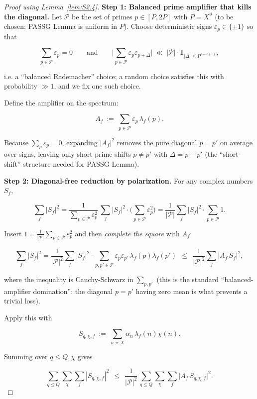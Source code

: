 \documentclass[11pt]{article}
\theoremstyle{definition}
\theoremstyle{remark}
\numberwithin{equation}{part}
\begin{document}
\begin{proof}[Proof using Lemma~\ref{lem:S2.4}]

	\noindent\textbf{Step 1: Balanced prime amplifier that kills the diagonal.}
	Let $\mathcal P$ be the set of primes $p\in[P,2P]$ with $P=X^\vartheta$ (to be chosen; PASSG Lemma is uniform in $P$).
	Choose deterministic signs $\varepsilon_p\in\{\pm 1\}$ so that

	$$
		\sum_{p\in\mathcal P}\varepsilon_p=0
		\qquad\text{and}\qquad
		\Big|\sum_{p\in\mathcal P}\varepsilon_p\varepsilon_{p+\Delta}\Big|\ \ll\ |\mathcal P|\cdot \mathbf{1}_{|\Delta|\le P^{1-o(1)}},
	$$

	i.e. a “balanced Rademacher” choice; a random choice satisfies this with probability $\gg 1$, and we fix one such choice.

	Define the amplifier on the spectrum:

	$$
		A_f \ :=\ \sum_{p\in\mathcal P}\varepsilon_p\,\lambda_f(p).
	$$

	Because $\sum_p\varepsilon_p=0$, expanding $|A_f|^2$ removes the pure diagonal $p=p'$ on average over signs, leaving only short prime shifts $p\neq p'$ with $\Delta = p-p'$ (the “short-shift” structure needed for PASSG Lemma).

	\noindent\textbf{Step 2: Diagonal-free reduction by polarization.}
	For any complex numbers $S_f$,

	$$
		\sum_f |S_f|^2
		=\frac{1}{\sum_{p\in\mathcal P}\varepsilon_p^2}\,
		\sum_f |S_f|^2\cdot \Big(\sum_{p\in\mathcal P}\varepsilon_p^2\Big)
		=\frac{1}{|\mathcal P|}\sum_f |S_f|^2\cdot \sum_{p\in\mathcal P}1.
	$$

	Insert $1=\frac{1}{|\mathcal P|}\sum_{p\in\mathcal P}\varepsilon_p^2$ and then \emph{complete the square} with $A_f$:

	$$
		\sum_f |S_f|^2
		=\frac{1}{|\mathcal P|^2}\sum_f |S_f|^2\cdot \sum_{p,p'\in\mathcal P}\varepsilon_p\varepsilon_{p'}\,\lambda_f(p)\lambda_f(p')
		\ \ \le\ \ \frac{1}{|\mathcal P|^2}\sum_f |A_f\,S_f|^2,
	$$

	where the inequality is Cauchy-Schwarz in $\sum_{p,p'}$ (this is the standard “balanced-amplifier domination”: the diagonal $p=p'$ having zero mean is what prevents a trivial loss).

	Apply this with

	$$
		S_{q,\chi,f}\ :=\ \sum_{n\asymp X}\alpha_n\,\lambda_f(n)\chi(n).
	$$

	Summing over $q\le Q,\chi$ gives

	\begin{equation}\label{eq:C31}
		\sum_{q\le Q}\sum_{\chi}\sum_f |S_{q,\chi,f}|^2
		\ \ \le\ \ \frac{1}{|\mathcal P|^2}\,
		\sum_{q\le Q}\sum_{\chi}\sum_f \big|A_f\,S_{q,\chi,f}\big|^2.
	\end{equation}


\end{proof}
\end{document}
